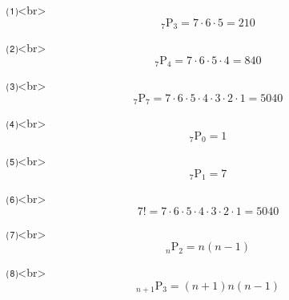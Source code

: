 ⑴<br>
$$
  _{7}\mathrm{P}_{3} = 7 \cdot 6 \cdot 5 = 210
$$

⑵<br>
$$
  _{7}\mathrm{P}_{4} = 7 \cdot 6 \cdot 5 \cdot 4 = 840
$$

⑶<br>
$$
  _{7}\mathrm{P}_{7} 
  = 7 \cdot 6 \cdot 5 \cdot 4 \cdot 3 \cdot 2 \cdot 1
  = 5040
$$

⑷<br>
$$
  _{7}\mathrm{P}_{0} = 1
$$

⑸<br>
$$
  _{7}\mathrm{P}_{1} = 7
$$

⑹<br>
$$
  7! = 7 \cdot 6 \cdot 5 \cdot 4 \cdot 3 \cdot 2 \cdot 1 = 5040
$$

⑺<br>
$$
  _{n}\mathrm{P}_{2} = n(n-1)
$$

⑻<br>
$$
  _{n+1}\mathrm{P}_{3} = (n+1)n(n-1)
$$
